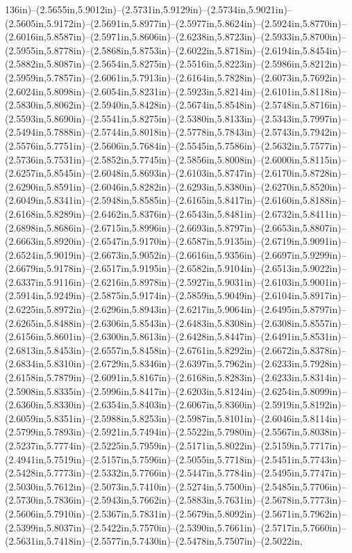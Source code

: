 136in)--(2.5655in,5.9012in)--(2.5731in,5.9129in)--(2.5734in,5.9021in)--(2.5605in,5.9172in)--(2.5691in,5.8977in)--(2.5977in,5.8624in)--(2.5924in,5.8770in)--(2.6016in,5.8587in)--(2.5971in,5.8606in)--(2.6238in,5.8723in)--(2.5933in,5.8700in)--(2.5955in,5.8778in)--(2.5868in,5.8753in)--(2.6022in,5.8718in)--(2.6194in,5.8454in)--(2.5882in,5.8087in)--(2.5654in,5.8275in)--(2.5516in,5.8223in)--(2.5986in,5.8212in)--(2.5959in,5.7857in)--(2.6061in,5.7913in)--(2.6164in,5.7828in)--(2.6073in,5.7692in)--(2.6024in,5.8098in)--(2.6054in,5.8231in)--(2.5923in,5.8214in)--(2.6101in,5.8118in)--(2.5830in,5.8062in)--(2.5940in,5.8428in)--(2.5674in,5.8548in)--(2.5748in,5.8716in)--(2.5593in,5.8690in)--(2.5541in,5.8275in)--(2.5380in,5.8133in)--(2.5343in,5.7997in)--(2.5494in,5.7888in)--(2.5744in,5.8018in)--(2.5778in,5.7843in)--(2.5743in,5.7942in)--(2.5576in,5.7751in)--(2.5606in,5.7684in)--(2.5545in,5.7586in)--(2.5632in,5.7577in)--(2.5736in,5.7531in)--(2.5852in,5.7745in)--(2.5856in,5.8008in)--(2.6000in,5.8115in)--(2.6257in,5.8545in)--(2.6048in,5.8693in)--(2.6103in,5.8747in)--(2.6170in,5.8728in)--(2.6290in,5.8591in)--(2.6046in,5.8282in)--(2.6293in,5.8380in)--(2.6270in,5.8520in)--(2.6049in,5.8341in)--(2.5948in,5.8585in)--(2.6165in,5.8417in)--(2.6160in,5.8188in)--(2.6168in,5.8289in)--(2.6462in,5.8376in)--(2.6543in,5.8481in)--(2.6732in,5.8411in)--(2.6898in,5.8686in)--(2.6715in,5.8996in)--(2.6693in,5.8797in)--(2.6653in,5.8807in)--(2.6663in,5.8920in)--(2.6547in,5.9170in)--(2.6587in,5.9135in)--(2.6719in,5.9091in)--(2.6524in,5.9019in)--(2.6673in,5.9052in)--(2.6616in,5.9356in)--(2.6697in,5.9299in)--(2.6679in,5.9178in)--(2.6517in,5.9195in)--(2.6582in,5.9104in)--(2.6513in,5.9022in)--(2.6337in,5.9116in)--(2.6216in,5.8978in)--(2.5927in,5.9031in)--(2.6103in,5.9001in)--(2.5914in,5.9249in)--(2.5875in,5.9174in)--(2.5859in,5.9049in)--(2.6104in,5.8917in)--(2.6225in,5.8972in)--(2.6296in,5.8943in)--(2.6217in,5.9064in)--(2.6495in,5.8797in)--(2.6265in,5.8488in)--(2.6306in,5.8543in)--(2.6483in,5.8308in)--(2.6308in,5.8557in)--(2.6156in,5.8601in)--(2.6300in,5.8613in)--(2.6428in,5.8447in)--(2.6491in,5.8531in)--(2.6813in,5.8453in)--(2.6557in,5.8458in)--(2.6761in,5.8292in)--(2.6672in,5.8378in)--(2.6834in,5.8310in)--(2.6729in,5.8346in)--(2.6397in,5.7962in)--(2.6233in,5.7928in)--(2.6158in,5.7879in)--(2.6091in,5.8167in)--(2.6168in,5.8283in)--(2.6233in,5.8314in)--(2.5908in,5.8335in)--(2.5996in,5.8417in)--(2.6203in,5.8124in)--(2.6254in,5.8099in)--(2.6360in,5.8330in)--(2.6354in,5.8403in)--(2.6067in,5.8360in)--(2.5919in,5.8192in)--(2.6059in,5.8351in)--(2.5988in,5.8253in)--(2.5987in,5.8101in)--(2.6046in,5.8114in)--(2.5799in,5.7893in)--(2.5921in,5.7494in)--(2.5522in,5.7980in)--(2.5567in,5.8038in)--(2.5237in,5.7774in)--(2.5225in,5.7959in)--(2.5171in,5.8022in)--(2.5159in,5.7717in)--(2.4941in,5.7519in)--(2.5157in,5.7596in)--(2.5055in,5.7718in)--(2.5451in,5.7743in)--(2.5428in,5.7773in)--(2.5332in,5.7766in)--(2.5447in,5.7784in)--(2.5495in,5.7747in)--(2.5030in,5.7612in)--(2.5073in,5.7410in)--(2.5274in,5.7500in)--(2.5485in,5.7706in)--(2.5730in,5.7836in)--(2.5943in,5.7662in)--(2.5883in,5.7631in)--(2.5678in,5.7773in)--(2.5606in,5.7910in)--(2.5367in,5.7831in)--(2.5679in,5.8092in)--(2.5671in,5.7962in)--(2.5399in,5.8037in)--(2.5422in,5.7570in)--(2.5390in,5.7661in)--(2.5717in,5.7660in)--(2.5631in,5.7418in)--(2.5577in,5.7430in)--(2.5478in,5.7507in)--(2.5022in,